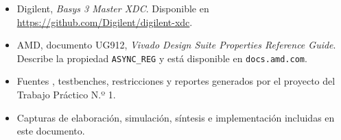 
\begin{itemize}
		\raggedright
	\item Digilent, \textit{Basys 3 Master XDC}. Disponible en
		\url{https://github.com/Digilent/digilent-xdc}.
	\item AMD, documento UG912, \textit{Vivado Design Suite Properties
		Reference Guide}. Describe la propiedad \texttt{ASYNC\_REG} y está
		disponible en \texttt{docs.amd.com}.
	\item Fuentes , testbenches, restricciones y
		reportes generados por el proyecto del Trabajo Práctico N.º 1.
	\item Capturas de elaboración, simulación, síntesis e implementación
		incluidas en este documento.
\end{itemize}
